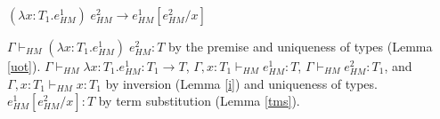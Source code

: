 \begin{case}
$(\lambda x:T_{1}.e_{HM}^{1})\;e_{HM}^{2}\rightarrow e_{HM}^{1}[e_{HM}^{2}/x]$

$\Gamma\vdash_{HM}(\lambda x:T_{1}.e_{HM}^{1})\;e_{HM}^{2}:T$ by the premise and uniqueness of types (Lemma \ref{uot}).  $\Gamma\vdash_{HM}\lambda x:T_{1}.e_{HM}^{1}:T_{1}\rightarrow T$, $\Gamma,x:T_{1}\vdash_{HM}e_{HM}^{1}:T$, $\Gamma\vdash_{HM}e_{HM}^{2}:T_{1}$, and $\Gamma,x:T_{1}\vdash_{HM}x:T_{1}$ by inversion (Lemma \ref{i}) and uniqueness of types.  $e_{HM}^{1}[e_{HM}^{2}/x]:T$ by term substitution (Lemma \ref{tms}).
\end{case}
